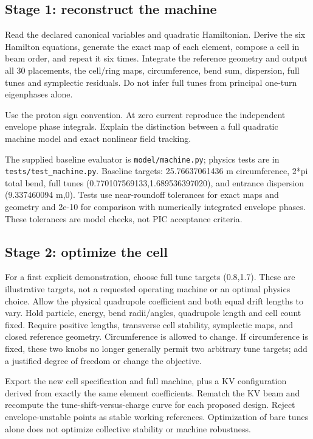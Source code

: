\documentclass[
  11pt,
  a4paper,
]{article}
\begin{document}
\subsection{Stage 1: reconstruct the
machine}\label{stage-1-reconstruct-the-machine}

Read the declared canonical variables and quadratic Hamiltonian. Derive
the six Hamilton equations, generate the exact map of each element,
compose a cell in beam order, and repeat it six times. Integrate the
reference geometry and output all 30 placements, the cell/ring maps,
circumference, bend sum, dispersion, full tunes and symplectic
residuals. Do not infer full tunes from principal one-turn eigenphases
alone.

Use the proton sign convention. At zero current reproduce the
independent envelope phase integrals. Explain the distinction between a
full quadratic machine model and exact nonlinear field tracking.

The supplied baseline evaluator is \texttt{model/machine.py}; physics
tests are in \texttt{tests/test\_machine.py}. Baseline targets:
25.76637061436 m circumference, 2*pi total bend, full tunes
(0.770107569133,1.689536397020), and entrance dispersion (9.337460094
m,0). Tests use near-roundoff tolerances for exact maps and geometry and
2e-10 for comparison with numerically integrated envelope phases. These
tolerances are model checks, not PIC acceptance criteria.

\subsection{Stage 2: optimize the cell}\label{stage-2-optimize-the-cell}

For a first explicit demonstration, choose full tune targets (0.8,1.7).
These are illustrative targets, not a requested operating machine or an
optimal physics choice. Allow the physical quadrupole coefficient and
both equal drift lengths to vary. Hold particle, energy, bend
radii/angles, quadrupole length and cell count fixed. Require positive
lengths, transverse cell stability, symplectic maps, and closed
reference geometry. Circumference is allowed to change. If circumference
is fixed, these two knobs no longer generally permit two arbitrary tune
targets; add a justified degree of freedom or change the objective.

Export the new cell specification and full machine, plus a KV
configuration derived from exactly the same element coefficients.
Rematch the KV beam and recompute the tune-shift-versus-charge curve for
each proposed design. Reject envelope-unstable points as stable working
references. Optimization of bare tunes alone does not optimize
collective stability or machine robustness.
\end{document}
